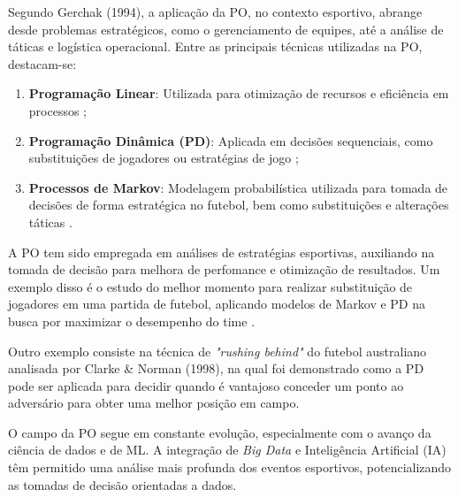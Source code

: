Segundo Gerchak (1994), a aplicação da PO, no contexto esportivo, abrange desde problemas estratégicos, como o gerenciamento de equipes, até a análise de táticas e logística operacional.
Entre as principais técnicas utilizadas na PO, destacam-se:

\begin{enumerate}
    \item \textbf{Programação Linear}: Utilizada para otimização de recursos e eficiência em processos \cite{Medri2009}; 
    \item \textbf{Programação Dinâmica (PD)}: Aplicada em decisões sequenciais, como substituições de jogadores ou estratégias de jogo \cite{Clarke1998};
    \item \textbf{Processos de Markov}: Modelagem probabilística utilizada para tomada de decisões de forma estratégica no futebol, bem como substituições e alterações táticas \cite{Hirotsu2002}.
\end{enumerate}

A PO tem sido empregada em análises de estratégias esportivas, auxiliando na tomada de decisão para melhora de perfomance e otimização de resultados. Um exemplo disso é o estudo do melhor momento para realizar substituição de jogadores em uma partida de futebol, aplicando modelos de Markov e PD na busca por maximizar o desempenho do time \cite{Hirotsu2002}.

Outro exemplo consiste na técnica de \textit{"rushing behind"} do futebol australiano analisada por Clarke \& Norman (1998), na qual foi demonstrado como a PD pode ser aplicada para decidir quando é vantajoso conceder um ponto ao adversário para obter uma melhor posição em campo.

O campo da PO segue em constante evolução, especialmente com o avanço da ciência de dados e de ML. A integração de \textit{Big Data} e Inteligência Artificial (IA) têm permitido uma análise mais profunda dos eventos esportivos, potencializando as tomadas de decisão orientadas a dados.

